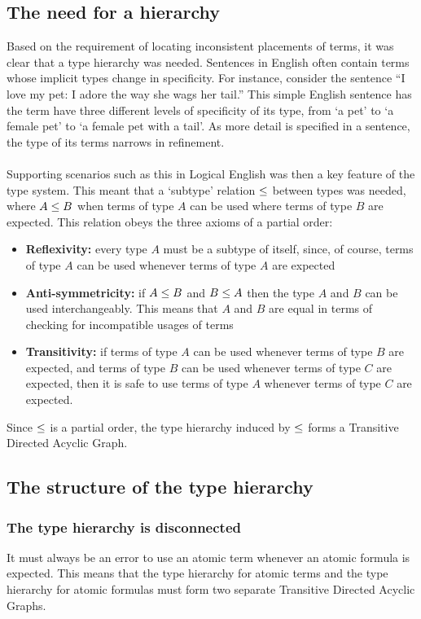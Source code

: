 \documentclass[../main.tex]{subfiles}
\begin{document}
\subsection{The need for a hierarchy}
Based on the requirement of locating inconsistent placements of terms, it was clear that a type hierarchy was needed. Sentences in English often contain terms whose implicit types change in specificity. 
For instance, consider the sentence ``I love my pet: I adore the way she wags her tail.'' This simple English sentence has the term  have three different levels of specificity of its type, from `a pet' to `a female pet' to `a female pet with a tail'. As more detail is specified in a sentence, the type of its terms narrows in refinement. 
\\
\\
Supporting scenarios such as this in Logical English was then a key feature of the type system. This meant that a `subtype' relation $\leq$ between types was needed, where $A \leq B$ when terms of type $A$ can be used where terms of type $B$ are expected. This relation obeys the three axioms of a partial order:
\begin{itemize}
    \item \textbf{Reflexivity:} every type $A$ must be a subtype of itself, since, of course, terms of type $A$ can be used whenever terms of type $A$ are expected
    \item \textbf{Anti-symmetricity:} if $A \leq B$ and $B \leq A$ then the type $A$ and $B$ can be used interchangeably. This means that $A$ and $B$ are equal in terms of checking for incompatible usages of terms
    \item \textbf{Transitivity:} if terms of type $A$ can be used whenever terms of type $B$ are expected, and terms of type $B$ can be used whenever terms of type $C$ are expected, then it is safe to use terms of type $A$ whenever terms of type $C$ are expected.
\end{itemize}
Since $\leq$ is a partial order, the type hierarchy induced by $\leq$ forms a Transitive Directed Acyclic Graph. 
\subsection{The structure of the type hierarchy}
\subsubsection{The type hierarchy is disconnected}
It must always be an error to use an atomic term whenever an atomic formula is expected. This means that the type hierarchy for atomic terms and the type hierarchy for atomic formulas must form two separate Transitive Directed Acyclic Graphs. 
\end{document}

